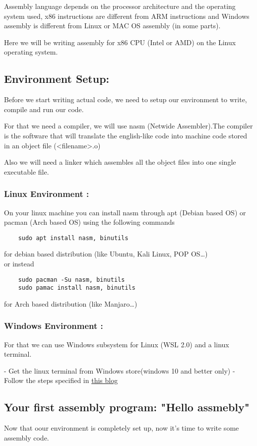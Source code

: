 \documentclass[10pt]{article}
\begin{document}
    Assembly language depends on the processor architecture and the operating system used, x86 instructions are 
    different from ARM instructions and Windows assembly is different from Linux or MAC OS assembly (in some parts).

    Here we will be writing assembly for x86 CPU (Intel or AMD) on the Linux operating system.

    \subsection{Environment Setup: }
    \tabto{20pt}Before we start writing actual code, we need to setup our environment to write, compile and run our code.
    
    For that we need a compiler, we will use nasm (Netwide Assembler).The compiler is the software that will translate the english-like code into machine code stored in an object file (<filename>.o)
    
    Also we will need a linker which assembles all the object files into one single executable file.

    \subsubsection{Linux Environment : }
    \tabto{20pt}On your linux machine you can install nasm through apt (Debian based OS) or pacman (Arch based OS) using the following commands
    \begin{verbatim}
    sudo apt install nasm, binutils
    \end{verbatim}
    for debian based distribution (like Ubuntu, Kali Linux, POP OS\dots)\\
    or instead
    \begin{verbatim}
    sudo pacman -Su nasm, binutils
    sudo pamac install nasm, binutils
    \end{verbatim}
    for Arch based distribution (like Manjaro\dots)
    \subsubsection{Windows Environment : }
    \tabto{20pt}For that we can use Windows subsystem for Linux (WSL 2.0) and a linux terminal.

    - Get the linux terminal from Windows store(windows 10 and better only)
    - Follow the steps specified in \href{https://pureinfotech.com/install-windows-subsystem-linux-2-windows-10/}{this blog}
    \subsection{Your first assembly program: "Hello assmebly"}
    Now that oour environment is completely set up, now it's time to write some assembly code.
\end{document}
